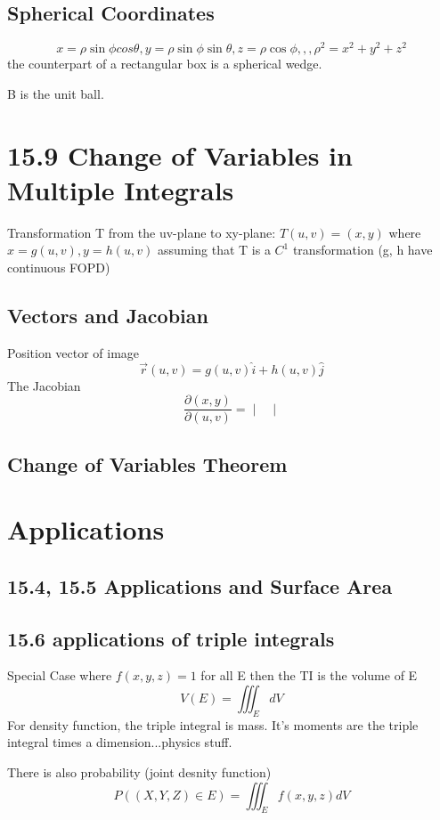 \documentclass[12pt]{book}%
\begin{document}
\subsection{Spherical Coordinates}
\begin{equation}
    x=\rho \sin \phi cos \theta, y=\rho \sin \phi \sin \theta ,z=\rho \cos \phi,,,\rho^2=x^2+y^2+z^2
\end{equation}
the counterpart of a rectangular box is a spherical wedge.
\par B is the unit ball.

\section{15.9 Change of Variables in Multiple Integrals } 

Transformation T from the uv-plane to xy-plane: $T(u,v)=(x,y)$
where $x=g(u,v), y=h(u,v)$ 
assuming that T is a $C^1$ transformation (g, h have continuous FOPD) 
\par  
\subsection{Vectors and Jacobian}
Position vector of image
\begin{equation}
    \vec r(u,v) = g(u,v) \hat i+h(u,v) \hat j 
\end{equation}
The Jacobian
\begin{equation}
    \frac{\partial(x,y)}{\partial(u,v)}=\begin{vmatrix}\end{vmatrix}
\end{equation}
\subsection{Change of Variables Theorem}

\section{Applications}
\subsection{}
\subsection{15.4, 15.5 Applications and Surface Area} 
\subsection {15.6 applications of triple integrals}
Special Case where $f(x,y,z)=1$  for all E then the TI is the volume of E
\begin{equation}
    V(E)=\iiint_E dV
\end{equation}
For density function, the triple integral is mass. It's moments are the triple integral times a dimension...physics stuff.
\par There is also probability (joint desnity function)
\begin{equation}
    P((X,Y,Z)\in E)=\iiint_E f(x,y,z)dV
\end{equation}
\end{document}
